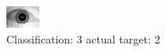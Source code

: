 \begin{figure}[h!]
\begin{center}
\includegraphics[width=0.60\columnwidth]{figures/ID1707_class_3_target_2.png}
\end{center}
\caption{ Classification: 3 actual target: 2}
\label{fig:ID1707_class_3_target_2}
\end{figure}
